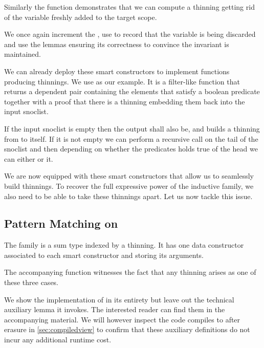 Similarly the  function demonstrates that we can compute a
thinning getting rid of the variable  freshly added to the target
scope.


We once again increment the , use  to
record that the variable is being discarded and use the lemmas ensuring its
correctness to convince \idris{} the invariant is maintained.

We can already deploy these smart constructors to implement functions producing
thinnings. We use  as our example. It is a filter-like
function that returns a dependent pair
containing the elements that satisfy a boolean predicate
together with a proof that there is a thinning embedding
them back into the input snoclist.


If the input snoclist is empty then the output shall also be, and
 builds a thinning from \IdrisData{[<]} to itself.
%
If it is not empty we can perform a recursive call on the tail of the snoclist
and then depending on whether the predicates holds true of the head we can either
 or  it.


We are now equipped with these smart constructors that allow us to seamlessly
build thinnings.
%
To recover the full expressive power of the inductive family, we also need to
be able to take these thinnings apart. Let us now tackle this issue.

\subsection{Pattern Matching on }

The  family is a sum type indexed by a thinning. It has one
data constructor associated to each smart constructor and storing its arguments.


The accompanying  function witnesses the fact that any
thinning arises as one of these three cases.


We show the implementation of  in its entirety but leave
out the technical auxiliary lemma it invokes.
%
The interested reader can find them in the accompanying material.
%
We will however inspect the code  compiles to after erasure
in \cref{sec:compiledview} to confirm that these auxiliary definitions do not
incur any additional runtime cost.

